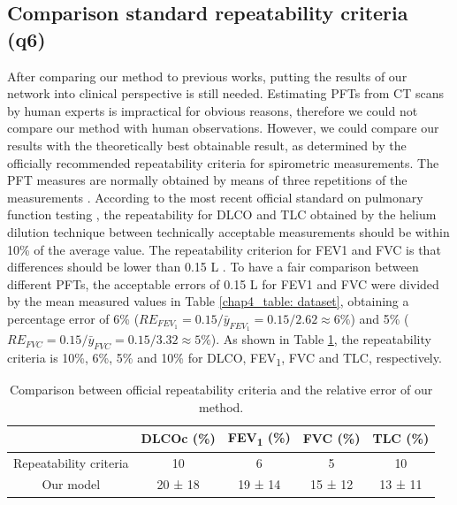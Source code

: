 \subsection{Comparison standard repeatability criteria (q6)}
After comparing our method to previous works, putting the results of our network into clinical perspective is still needed. Estimating PFTs from CT scans by human experts is impractical for obvious reasons, therefore we could not compare our method with human observations. However, we could compare our results with the theoretically best obtainable result, as determined by the officially recommended repeatability criteria for spirometric measurements. The PFT measures are normally obtained by means of three repetitions of the measurements \cite{Sylvester2020}. According to the most recent official standard on pulmonary function testing \cite{Sylvester2020}, the repeatability for DLCO and TLC obtained by the helium dilution technique between technically acceptable measurements should be within 10\% of the average value. The repeatability criterion for FEV1 and FVC is that differences should be lower than 0.15 L \cite{Sylvester2020}. To have a fair comparison between different PFTs, the acceptable errors of 0.15 L for FEV1 and FVC were divided by the mean measured values in Table \ref{chap4_table: dataset}, obtaining a percentage error of 6\% ($RE_{FEV_1} = 0.15/\bar{y}_{FEV_1} = 0.15/2.62 \approx 6\%$) and 5\% ($RE_{FVC} = 0.15/\bar{y}_{FVC} = 0.15/3.32 \approx 5\%$). As shown in Table \ref{chap4_table_compare_repeatibility}, the repeatability criteria is 10\%, 6\%, 5\% and 10\% for DLCO, FEV\textsubscript{1}, FVC and TLC, respectively. 

\begin{table}[h]
\centering
\caption{Comparison between official repeatability criteria and the relative error of our method.}
\begin{tabular}{c|c|c|c|c}
\hline
                                & DLCOc (\%) & FEV\textsubscript{1} (\%) & FVC (\%) & TLC (\%) \\ \hline
Repeatability criteria & 10         & 6         & 5        & 10       \\
Our model          & 20 ± 18    & 19 ± 14   & 15 ± 12  & 13 ± 11  \\
 \hline
\end{tabular}
\label{chap4_table_compare_repeatibility}
\end{table}




